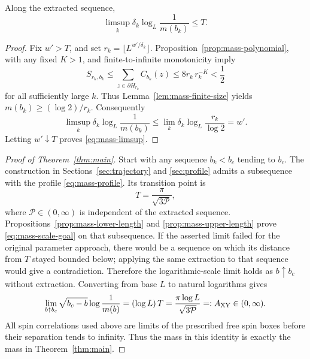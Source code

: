 \begin{proposition}\label{prop:mass-upper-length}
Along the extracted sequence,
\begin{equation}\label{eq:mass-limsup}
                 \limsup_k\delta_k\log_L\frac1{m(b_k)}\le T.
\end{equation}
\end{proposition}

\begin{proof}
Fix \(w'>T\), and set \(r_k=\lfloor L^{w'/\delta_k}\rfloor\).
Proposition~\ref{prop:mass-polynomial}, with any fixed \(K>1\),
and finite-to-infinite monotonicity imply
\[
 S_{r_k,b_k}\le\sum_{z\in\partial H_{r_k}}C_{b_k}(z)
                     \le8r_k\,r_k^{-K}<\frac12
\]
for all sufficiently large \(k\).  Thus
Lemma~\ref{lem:mass-finite-size} yields
\(m(b_k)\ge(\log2)/r_k\).  Consequently
\[
 \limsup_k\delta_k\log_L\frac1{m(b_k)}
 \le\lim_k\delta_k\log_L\frac{r_k}{\log2}=w'.
\]
Letting \(w'\downarrow T\) proves \eqref{eq:mass-limsup}.
\end{proof}

\begin{proof}[Proof of Theorem~\ref{thm:main}]
Start with any sequence \(b_k<b_c\) tending to \(b_c\).
The construction in Sections~\ref{sec:trajectory} and
\ref{sec:profile} admits a subsequence with the profile
\eqref{eq:mass-profile}.  Its transition point is
\[
                       T=\frac{\pi}{\sqrt{3\mathcal P}},
\]
where \(\mathcal P\in(0,\infty)\) is independent of the extracted
sequence.  Propositions~\ref{prop:mass-lower-length} and
\ref{prop:mass-upper-length} prove
\eqref{eq:mass-scale-goal} on that subsequence.
If the asserted limit failed for the original parameter approach,
there would be a sequence on which its distance from \(T\) stayed
bounded below; applying the same extraction to that sequence
would give a contradiction.  Therefore the logarithmic-scale
limit holds as \(b\uparrow b_c\) without extraction.
Converting from base \(L\) to natural logarithms gives
\[
 \lim_{b\uparrow b_c}\sqrt{b_c-b}\log\frac1{m(b)}
       =(\log L)\,T
       =\frac{\pi\log L}{\sqrt{3\mathcal P}}
       =:A_{\rm XY}\in(0,\infty).
\]
All spin correlations used above are limits of the prescribed
free spin boxes before their separation tends to infinity.  Thus
the mass in this identity is exactly the mass in
Theorem~\ref{thm:main}.
\end{proof}
